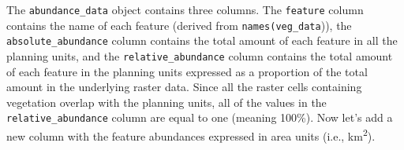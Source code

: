 \documentclass[
  12pt,
]{book}
\newenvironment{Shaded}{\begin{snugshade}}{\end{snugshade}}
\newcommand{\CommentTok}[1]{\textcolor[rgb]{0.56,0.35,0.01}{\textit{#1}}}
\newcommand{\DecValTok}[1]{\textcolor[rgb]{0.00,0.00,0.81}{#1}}
\newcommand{\FunctionTok}[1]{\textcolor[rgb]{0.00,0.00,0.00}{#1}}
\newcommand{\NormalTok}[1]{#1}
\newcommand{\OtherTok}[1]{\textcolor[rgb]{0.56,0.35,0.01}{#1}}
\newcommand{\SpecialCharTok}[1]{\textcolor[rgb]{0.00,0.00,0.00}{#1}}
\begin{document}
The \texttt{abundance\_data} object contains three columns. The \texttt{feature} column contains the name of each feature (derived from \texttt{names(veg\_data})), the \texttt{absolute\_abundance} column contains the total amount of each feature in all the planning units, and the \texttt{relative\_abundance} column contains the total amount of each feature in the planning units expressed as a proportion of the total amount in the underlying raster data. Since all the raster cells containing vegetation overlap with the planning units, all of the values in the \texttt{relative\_abundance} column are equal to one (meaning 100\%). Now let's add a new column with the feature abundances expressed in area units (i.e., km\textsuperscript{2}).

\begin{Shaded}
\end{Shaded}
\end{document}
